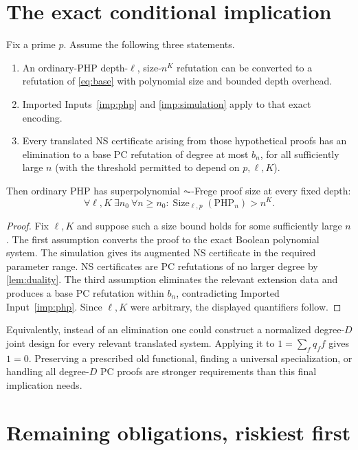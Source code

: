 \section{The exact conditional implication}
\begin{theorem}\label{thm:conditionalpayoff}
Fix a prime $p$. Assume the following three statements.
\begin{enumerate}
\item An ordinary-PHP depth-$\ell$, size-$n^K$ refutation can be converted to a refutation of \eqref{eq:base} with polynomial size and bounded depth overhead.
\item Imported Inputs~\ref{imp:php} and \ref{imp:simulation} apply to that exact encoding.
\item Every translated NS certificate arising from those hypothetical proofs has an elimination to a base PC refutation of degree at most $b_n$, for all sufficiently large $n$ (with the threshold permitted to depend on $p,\ell,K$).
\end{enumerate}
Then ordinary PHP has superpolynomial $\AC$-Frege proof size at every fixed depth:
\[
 \forall\ell,K\ \exists n_0\ \forall n\ge n_0:
 \operatorname{Size}_{\ell,p}(\mathrm{PHP}_n)>n^K.
\]
\end{theorem}
\begin{proof}
Fix $\ell,K$ and suppose such a size bound holds for some sufficiently large $n$. The first assumption converts the proof to the exact Boolean polynomial system. The simulation gives its augmented NS certificate in the required parameter range. NS certificates are PC refutations of no larger degree by \cref{lem:duality}. The third assumption eliminates the relevant extension data and produces a base PC refutation within $b_n$, contradicting Imported Input~\ref{imp:php}. Since $\ell,K$ were arbitrary, the displayed quantifiers follow.
\end{proof}

Equivalently, instead of an elimination one could construct a normalized degree-$D$ joint design for every relevant translated system. Applying it to $1=\sum_fq_ff$ gives $1=0$. Preserving a prescribed old functional, finding a universal specialization, or handling all degree-$D$ PC proofs are stronger requirements than this final implication needs.

\section{Remaining obligations, riskiest first}
